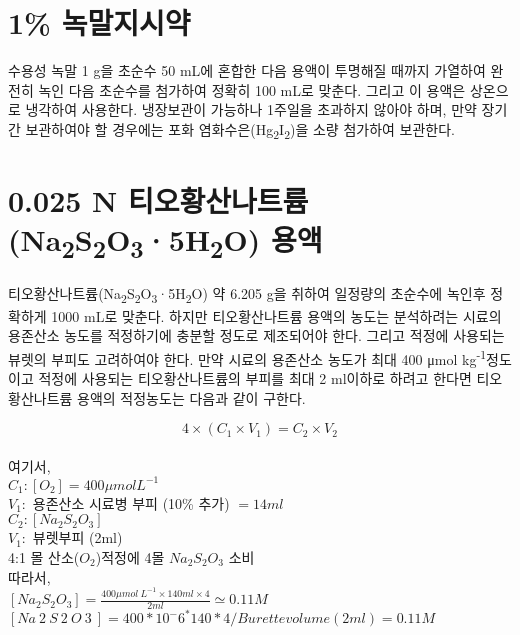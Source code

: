 \documentclass[
]{book}
\begin{document}
\hypertarget{uxb179uxb9d0uxc9c0uxc2dcuxc57d}{%
\section{1\% 녹말지시약}\label{uxb179uxb9d0uxc9c0uxc2dcuxc57d}}

수용성 녹말 1 g을 초순수 50 mL에 혼합한 다음 용액이 투명해질 때까지 가열하여 완전히 녹인 다음 초순수를 첨가하여 정확히 100 mL로 맞춘다. 그리고 이 용액은 상온으로 냉각하여 사용한다. 냉장보관이 가능하나 1주일을 초과하지 않아야 하며, 만약 장기간 보관하여야 할 경우에는 포화 염화수은(Hg\textsubscript{2}I\textsubscript{2})을 소량 첨가하여 보관한다.

\hypertarget{n-uxd2f0uxc624uxd669uxc0b0uxb098uxd2b8uxb968na2s2o35h2o-uxc6a9uxc561}{%
\section{\texorpdfstring{0.025 N 티오황산나트륨(Na\textsubscript{2}S\textsubscript{2}O\textsubscript{3}·5H\textsubscript{2}O) 용액}{0.025 N 티오황산나트륨(Na2S2O3·5H2O) 용액}}\label{n-uxd2f0uxc624uxd669uxc0b0uxb098uxd2b8uxb968na2s2o35h2o-uxc6a9uxc561}}

티오황산나트륨(Na\textsubscript{2}S\textsubscript{2}O\textsubscript{3}·5H\textsubscript{2}O) 약 6.205 g을 취하여 일정량의 초순수에 녹인후 정확하게 1000 mL로 맞춘다. 하지만 티오황산나트륨 용액의 농도는 분석하려는 시료의 용존산소 농도를 적정하기에 충분할 정도로 제조되어야 한다. 그리고 적정에 사용되는 뷰렛의 부피도 고려하여야 한다. 만약 시료의 용존산소 농도가 최대 400 μmol kg\textsuperscript{-1}정도이고 적정에 사용되는 티오황산나트륨의 부피를 최대 2 ml이하로 하려고 한다면 티오황산나트륨 용액의 적정농도는 다음과 같이 구한다.

\[4 \times (C_{1} \times V_{1}) = C_{2} \times V_{2}\]\\
여기서,\\
\(C_{1}: [O_{2}]=400 \mu mol L^{-1}\)\\
\(V_{1}:\) 용존산소 시료병 부피 (10\% 추가) \(=14ml\)\\
\(C_{2}: [Na_{2}S_{2}O_{3}]\)\\
\(V_{1}:\) 뷰렛부피 (2ml)\\
4:1 몰 산소(\(O_{2}\))적정에 4몰 \(Na_{2}S_{2}O_{3}\) 소비\\
따라서,\\
\([Na_{2}S_{2}O_{3}]=\frac{400 \mu mol ~ L^{-1} \times 140ml \times 4}{2ml} \simeq 0.11M\)\\
\([Na~2~S~2~O~3~]=400 * 10^-6^ * 140 * 4 / Burette volume (2 ml) = 0.11M\)
\end{document}
